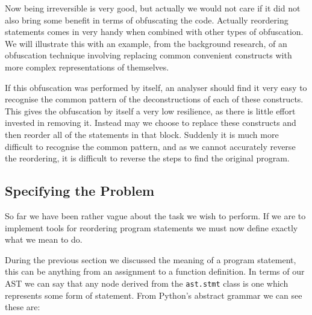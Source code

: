 \documentclass[twoside,a4paper]{report}
\begin{document}
Now being irreversible is very good, but actually we would not care if it did not also bring some benefit in terms of obfuscating the code. Actually
reordering statements comes in very handy when combined with other types of obfuscation. We will illustrate this with an example, from the background
research, of an obfuscation technique involving replacing common convenient constructs with more complex representations of themselves.

If this obfuscation was performed by itself, an analyser should find it very easy to recognise the common pattern of the deconstructions of each of these
constructs. This gives the obfuscation by itself a very low resilience, as there is little effort invested in removing it. Instead may we choose to replace
these constructs and then reorder all of the statements in that block. Suddenly it is much more difficult to recognise the common pattern, and as we cannot
accurately reverse the reordering, it is difficult to reverse the steps to find the original program.

\subsection{Specifying the Problem}

So far we have been rather vague about the task we wish to perform. If we are to implement tools for reordering program statements we must now
define exactly what we mean to do.

During the previous section we discussed the meaning of a program statement, this can be anything from an assignment to a function definition.
In terms of our AST we can say that any node derived from the \texttt{ast.stmt} class is one which represents some form of statement. From Python's
abstract grammar \cite{pyagrammar} we can see these are:
\end{document}
